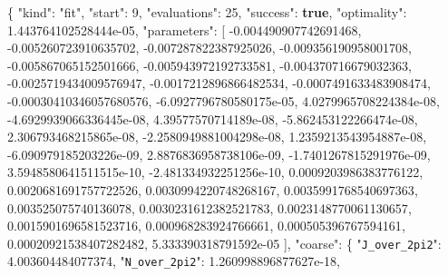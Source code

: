\documentclass[
  10pt,
]{article}
\newenvironment{Shaded}{}{}
\newcommand{\DataTypeTok}[1]{\textcolor[rgb]{0.56,0.13,0.00}{#1}}
\newcommand{\DecValTok}[1]{\textcolor[rgb]{0.25,0.63,0.44}{#1}}
\newcommand{\FloatTok}[1]{\textcolor[rgb]{0.25,0.63,0.44}{#1}}
\newcommand{\FunctionTok}[1]{\textcolor[rgb]{0.02,0.16,0.49}{#1}}
\newcommand{\KeywordTok}[1]{\textcolor[rgb]{0.00,0.44,0.13}{\textbf{#1}}}
\newcommand{\OtherTok}[1]{\textcolor[rgb]{0.00,0.44,0.13}{#1}}
\newcommand{\StringTok}[1]{\textcolor[rgb]{0.25,0.44,0.63}{#1}}
\begin{document}
\begin{Shaded}
\begin{Highlighting}[]
\FunctionTok{\{}
  \DataTypeTok{"kind"}\FunctionTok{:} \StringTok{"fit"}\FunctionTok{,}
  \DataTypeTok{"start"}\FunctionTok{:} \DecValTok{9}\FunctionTok{,}
  \DataTypeTok{"evaluations"}\FunctionTok{:} \DecValTok{25}\FunctionTok{,}
  \DataTypeTok{"success"}\FunctionTok{:} \KeywordTok{true}\FunctionTok{,}
  \DataTypeTok{"optimality"}\FunctionTok{:} \FloatTok{1.443764102528444e{-}05}\FunctionTok{,}
  \DataTypeTok{"parameters"}\FunctionTok{:} \OtherTok{[}
    \FloatTok{{-}0.004490907742691468}\OtherTok{,}
    \FloatTok{{-}0.005260723910635702}\OtherTok{,}
    \FloatTok{{-}0.007287822387925026}\OtherTok{,}
    \FloatTok{{-}0.009356190958001708}\OtherTok{,}
    \FloatTok{{-}0.005867065152501666}\OtherTok{,}
    \FloatTok{{-}0.005943972192733581}\OtherTok{,}
    \FloatTok{{-}0.004370716679032363}\OtherTok{,}
    \FloatTok{{-}0.0025719434009576947}\OtherTok{,}
    \FloatTok{{-}0.0017212896866482534}\OtherTok{,}
    \FloatTok{{-}0.0007491633483908474}\OtherTok{,}
    \FloatTok{{-}0.00030410346057680576}\OtherTok{,}
    \FloatTok{{-}6.0927796780580175e{-}05}\OtherTok{,}
    \FloatTok{4.0279965708224384e{-}08}\OtherTok{,}
    \FloatTok{{-}4.6929939066336445e{-}08}\OtherTok{,}
    \FloatTok{4.39577570714189e{-}08}\OtherTok{,}
    \FloatTok{{-}5.862453122266474e{-}08}\OtherTok{,}
    \FloatTok{2.306793468215865e{-}08}\OtherTok{,}
    \FloatTok{{-}2.2580949881004298e{-}08}\OtherTok{,}
    \FloatTok{1.2359213543954887e{-}08}\OtherTok{,}
    \FloatTok{{-}6.090979185203226e{-}09}\OtherTok{,}
    \FloatTok{2.8876836958738106e{-}09}\OtherTok{,}
    \FloatTok{{-}1.7401267815291976e{-}09}\OtherTok{,}
    \FloatTok{3.5948580641511515e{-}10}\OtherTok{,}
    \FloatTok{{-}2.481334932251256e{-}10}\OtherTok{,}
    \FloatTok{0.0009203986383776122}\OtherTok{,}
    \FloatTok{0.0020681691757722526}\OtherTok{,}
    \FloatTok{0.0030994220748268167}\OtherTok{,}
    \FloatTok{0.0035991768540697363}\OtherTok{,}
    \FloatTok{0.003525075740136078}\OtherTok{,}
    \FloatTok{0.0030231612382521783}\OtherTok{,}
    \FloatTok{0.0023148770061130657}\OtherTok{,}
    \FloatTok{0.0015901696581523716}\OtherTok{,}
    \FloatTok{0.000968283924766661}\OtherTok{,}
    \FloatTok{0.000505396767594161}\OtherTok{,}
    \FloatTok{0.00020921538407282482}\OtherTok{,}
    \FloatTok{5.333390318791592e{-}05}
  \OtherTok{]}\FunctionTok{,}
  \DataTypeTok{"coarse"}\FunctionTok{:} \FunctionTok{\{}
    \DataTypeTok{"\nolinkurl{J_over_2pi2}"}\FunctionTok{:} \FloatTok{4.003604484077374}\FunctionTok{,}
    \DataTypeTok{"\nolinkurl{N_over_2pi2}"}\FunctionTok{:} \FloatTok{1.260998896877627e{-}18}\FunctionTok{,}

\end{Highlighting}
\end{Shaded}
\end{document}
